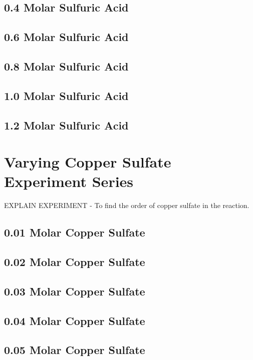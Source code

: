 	\subsection{0.4 Molar Sulfuric Acid}

	\subsection{0.6 Molar Sulfuric Acid}

	\subsection{0.8 Molar Sulfuric Acid}

	\subsection{1.0 Molar Sulfuric Acid}

	\subsection{1.2 Molar Sulfuric Acid}


\section{Varying Copper Sulfate Experiment Series}

EXPLAIN EXPERIMENT - To find the order of copper sulfate in the reaction.

	\subsection{0.01 Molar Copper Sulfate}

	\subsection{0.02 Molar Copper Sulfate}

	\subsection{0.03 Molar Copper Sulfate}

	\subsection{0.04 Molar Copper Sulfate}

	\subsection{0.05 Molar Copper Sulfate}

